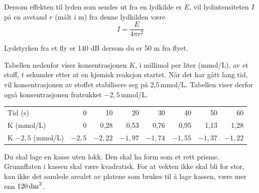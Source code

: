 Dersom effekten til lyden som sendes ut fra en lydkilde er $E$, vil
lydintensiteten $I$ på en avstand $r$ (målt i m) fra denne lydkilden være
%
\[
I = \frac{E}{4\pi r^2}
\]

Lydstyrken fra et fly er 140 dB dersom du er 50 m fra flyet.


Tabellen nedenfor viser konsentrasjonen $K$, i millimol per liter (mmol/L), av et
stoff, $t$ sekunder etter at en kjemisk reaksjon startet. 
Når det har gått lang tid, vil konsentrasjonen av stoffet stabilisere seg på 2,5\,mmol/L. Tabellen viser derfor også konsentrasjonen fratrukket $-2,5$\,mmol/L.

\begin{center}
	\small
	\begin{tabular}{l r r r r r r r}
		\hline
		Tid (s) & 0 & 10 & 20 & 30 & 40 & 50 & 60 \\
		K (mmol/L)& 0 & 0{,}28 & 0{,}53 & 0{,}76 & 0{,}95 & 1{,}13 & 1{,}28 \\
		K $-2{,}5$ (mmol/L) & $-2{,}5$ & $-2{,}22$ & $-1{,}97$ & $-1{,}74$ & $-1{,}55$ & $-1{,}37$ & $-1{,}22$ \\
		\hline
	\end{tabular}
\end{center}


Du skal lage en kasse uten lokk. Den skal ha form som et rett prisme.
Grunnflaten i kassen skal være kvadratisk. For at vekten ikke skal bli for stor,
kan ikke det samlede arealet av platene som brukes til å lage kassen, være mer
enn $120\,\text{dm}^2$.

